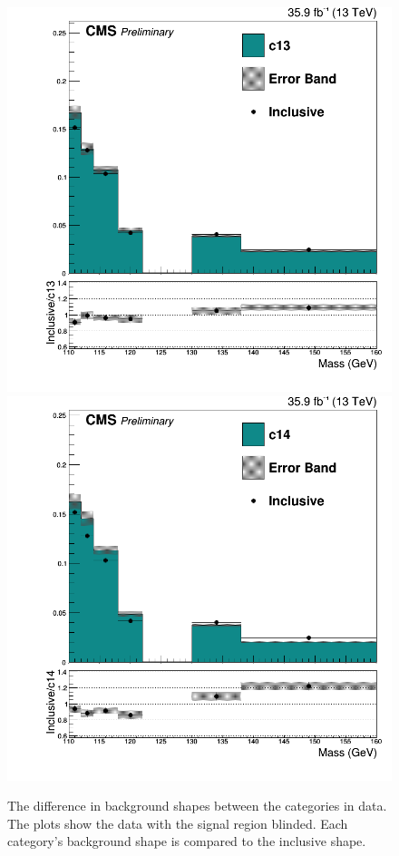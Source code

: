 \begin{figure}[h!]
  \includegraphics[width=0.25\linewidth]{images/bdt_cats/bkg_shapes_stack_c13.png}
  \includegraphics[width=0.25\linewidth]{images/bdt_cats/bkg_shapes_stack_c14.png}
  \caption[Background shapes in data in the different categories.]
   {The difference in background shapes between the categories in data. The plots show the data with the signal region blinded.
    Each category's background shape is compared to the inclusive shape.}
  \label{fig:bkg_shapes}
\end{figure}
